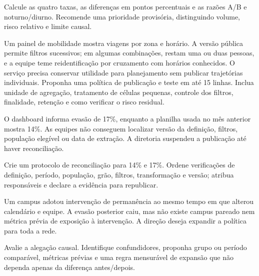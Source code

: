 \FonteDidatica

\Comando Calcule as quatro taxas, as diferenças em pontos percentuais e as razões A/B e noturno/diurno. Recomende uma prioridade provisória, distinguindo volume, risco relativo e limite causal.

\TextoBase Um painel de mobilidade mostra viagens por zona e horário. A versão pública permite filtros sucessivos; em algumas combinações, restam uma ou duas pessoas, e a equipe teme reidentificação por cruzamento com horários conhecidos. O serviço precisa conservar utilidade para planejamento sem publicar trajetórias individuais.
\FonteDidatica
\Comando Proponha uma política de publicação e teste em até 15 linhas. Inclua unidade de agregação, tratamento de células pequenas, controle dos filtros, finalidade, retenção e como verificar o risco residual.

\TextoBase

O dashboard informa evasão de 17\%, enquanto a planilha usada no mês anterior mostra 14\%. As equipes não conseguem localizar versão da definição, filtros, população elegível ou data de extração. A diretoria suspendeu a publicação até haver reconciliação.

\FonteDidatica

\Comando Crie um protocolo de reconciliação para 14\% e 17\%. Ordene verificações de definição, período, população, grão, filtros, transformação e versão; atribua responsáveis e declare a evidência para republicar.


\TextoBase

Um campus adotou intervenção de permanência ao mesmo tempo em que alterou calendário e equipe. A evasão posterior caiu, mas não existe campus pareado nem métrica prévia de exposição à intervenção. A direção deseja expandir a política para toda a rede.

\FonteDidatica

\Comando Avalie a alegação causal. Identifique confundidores, proponha grupo ou período comparável, métricas prévias e uma regra mensurável de expansão que não dependa apenas da diferença antes/depois.

\newpage

